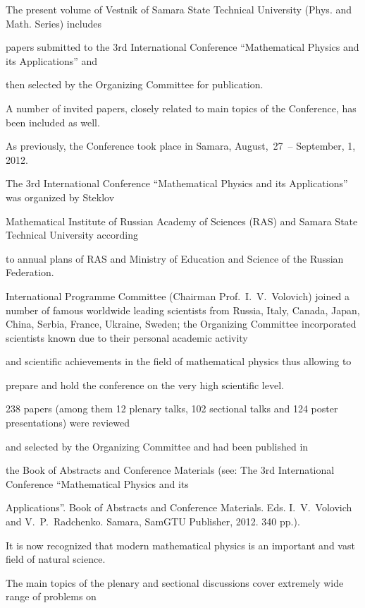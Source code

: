 \English



The present volume of Vestnik of Samara State Technical University (Phys. and Math. Series) includes

papers submitted to the 3rd International Conference ``Mathematical Physics and its Applications'' and

then selected by the Organizing Committee for publication.

A number of invited papers, closely related to main topics of the Conference, has been included as well.

As previously, the Conference took place in Samara, August,~27~-- September, 1, 2012.

The 3rd International Conference ``Mathematical Physics and its Applications'' was organized by Steklov

Mathematical Institute of Russian Academy of Sciences (RAS) and Samara State Technical University according

to annual plans of RAS and Ministry of Education and Science of the Russian Federation.



International Programme Committee (Chairman Prof.~I.~V.~Volovich) joined a number of famous worldwide leading scientists from Russia, Italy, Canada, Japan, China, Serbia, France, Ukraine, Sweden; the Organizing Committee incorporated scientists known due to their personal academic activity

and scientific achievements in the field of mathematical physics thus allowing to

prepare and hold the conference on the very high scientific level.

238 papers (among them 12 plenary talks, 102 sectional talks and 124 poster presentations) were reviewed

and selected by the Organizing Committee and had been published in

the Book of Abstracts and Conference Materials (see: The 3rd International Conference ``Mathematical Physics and its

Applications''. Book of Abstracts and Conference Materials. Eds. I.~V.~Volovich and V.~P.~Radchenko. Samara, SamGTU Publisher, 2012. 340 pp.).



It is now recognized that modern mathematical physics is an important and vast field of natural science.

The main topics of the plenary and sectional discussions cover extremely wide range of problems on

